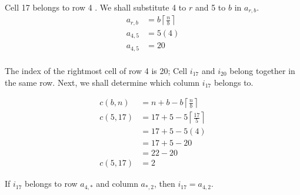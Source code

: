\documentclass[letterpaper, twoside,12pt]{article}
\begin{document}
    Cell 17 belongs to row 4 . We shall substitute 4 to $r$ and 5 to $b$ in $a_{r,b}$.
    \begin{equation*}
        \begin{split}
            a_{r,b} &= b\left\lceil \frac{n}{b} \right\rceil \\
            a_{4,5} &= 5(4) \\
            a_{4,5} &= 20 \\
        \end{split}
    \end{equation*}

    The index of the rightmost cell of row 4 is 20; Cell $i_{17}$ and $i_{20}$ belong together in the same row. Next, we shall determine which column $i_{17}$ belongs to.

    \begin{equation*}
        \begin{split}
            c(b,n) &= n + b - b\left\lceil \frac{n}{b} \right\rceil \\
            c(5,17) &= 17 + 5 - 5\left\lceil \frac{17}{5} \right\rceil \\
                &= 17 + 5 - 5(4) \\
                &= 17 + 5 - 20 \\
                &= 22 - 20 \\
            c(5,17) &= 2
        \end{split}
    \end{equation*}

    \newpage

    If $i_{17}$ belongs to row $a_{4,*}$ and column $a_{*,2}$, then $i_{17} = a_{4,2}$.
\end{document}
